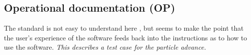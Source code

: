 \documentclass[12pt]{article}
\begin{document}
\subsection{Operational documentation (OP)}
The standard is not easy to understand here , but seems to make the point that 
the user's experience of the software feeds back into the instructions
as to how to use the software.
\emph{This describes a test case for the particle advance.}
\end{document}
